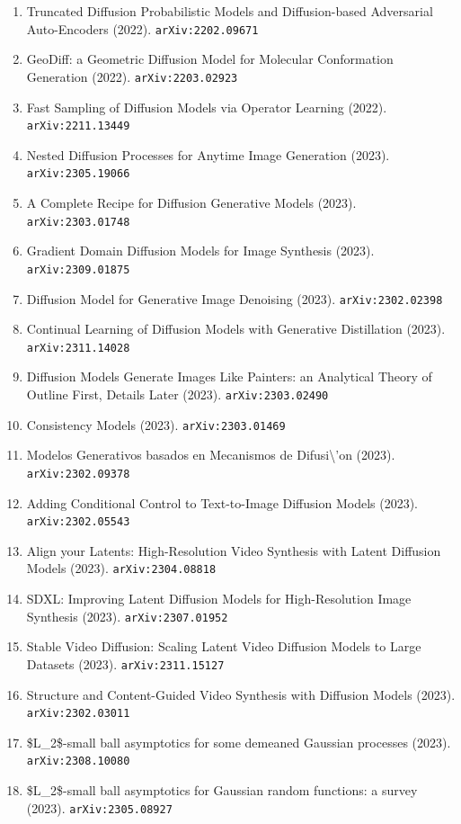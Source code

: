 \documentclass[11pt]{article}
\begin{document}
\begin{enumerate}
  with minimal data assumptions (2022). \texttt{arXiv:2209.11215}
  \item Truncated Diffusion Probabilistic Models and Diffusion-based Adversarial
  Auto-Encoders (2022). \texttt{arXiv:2202.09671}
  \item GeoDiff: a Geometric Diffusion Model for Molecular Conformation
  Generation (2022). \texttt{arXiv:2203.02923}
  \item Fast Sampling of Diffusion Models via Operator Learning (2022). \texttt{arXiv:2211.13449}
  \item Nested Diffusion Processes for Anytime Image Generation (2023). \texttt{arXiv:2305.19066}
  \item A Complete Recipe for Diffusion Generative Models (2023). \texttt{arXiv:2303.01748}
  \item Gradient Domain Diffusion Models for Image Synthesis (2023). \texttt{arXiv:2309.01875}
  \item Diffusion Model for Generative Image Denoising (2023). \texttt{arXiv:2302.02398}
  \item Continual Learning of Diffusion Models with Generative Distillation (2023). \texttt{arXiv:2311.14028}
  \item Diffusion Models Generate Images Like Painters: an Analytical Theory of
  Outline First, Details Later (2023). \texttt{arXiv:2303.02490}
  \item Consistency Models (2023). \texttt{arXiv:2303.01469}
  \item Modelos Generativos basados en Mecanismos de Difusi\textbackslash{}'on (2023). \texttt{arXiv:2302.09378}
  \item Adding Conditional Control to Text-to-Image Diffusion Models (2023). \texttt{arXiv:2302.05543}
  \item Align your Latents: High-Resolution Video Synthesis with Latent
  Diffusion Models (2023). \texttt{arXiv:2304.08818}
  \item SDXL: Improving Latent Diffusion Models for High-Resolution Image
  Synthesis (2023). \texttt{arXiv:2307.01952}
  \item Stable Video Diffusion: Scaling Latent Video Diffusion Models to Large
  Datasets (2023). \texttt{arXiv:2311.15127}
  \item Structure and Content-Guided Video Synthesis with Diffusion Models (2023). \texttt{arXiv:2302.03011}
  \item \$L\_2\$-small ball asymptotics for some demeaned Gaussian processes (2023). \texttt{arXiv:2308.10080}
  \item \$L\_2\$-small ball asymptotics for Gaussian random functions: a survey (2023). \texttt{arXiv:2305.08927}

\end{enumerate}
\end{document}
